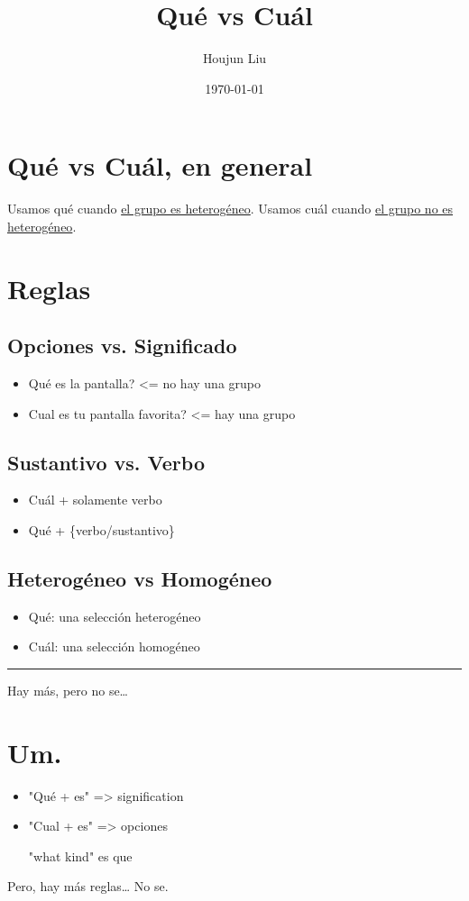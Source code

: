 \documentclass[letterpaper]{article}
\author{Houjun Liu}
\date{\today}
\title{Qué vs Cuál}
\renewcommand\maketitle{}
\begin{document}
\maketitle

\section{Qué vs Cuál, en general}
\label{sec:org5af0af5}
Usamos qué cuando \uline{el grupo es heterogéneo}. Usamos cuál cuando \uline{el grupo no es heterogéneo}.


\section{Reglas}
\label{sec:org55803f1}
\subsection{Opciones vs. Significado}
\label{sec:org92f61c0}
\begin{itemize}
\item Qué es la pantalla? <= no hay una grupo
\item Cual es tu pantalla favorita? <= hay una grupo
\end{itemize}

\subsection{Sustantivo vs. Verbo}
\label{sec:orgfe0ecca}
\begin{itemize}
\item Cuál + solamente verbo
\item Qué + \{verbo/sustantivo\}
\end{itemize}

\subsection{Heterogéneo vs Homogéneo}
\label{sec:orgcd4d864}
\begin{itemize}
\item Qué: una selección heterogéneo
\item Cuál: una selección homogéneo
\end{itemize}

\noindent\rule{\textwidth}{0.5pt}

Hay más, pero no se\ldots{}

\section{Um.}
\label{sec:org799c2f7}
\begin{itemize}
\item "Qué + es" => signification
\item "Cual + es" => opciones

"what kind" es que
\end{itemize}

Pero, hay más reglas\ldots{} No se.
\end{document}
